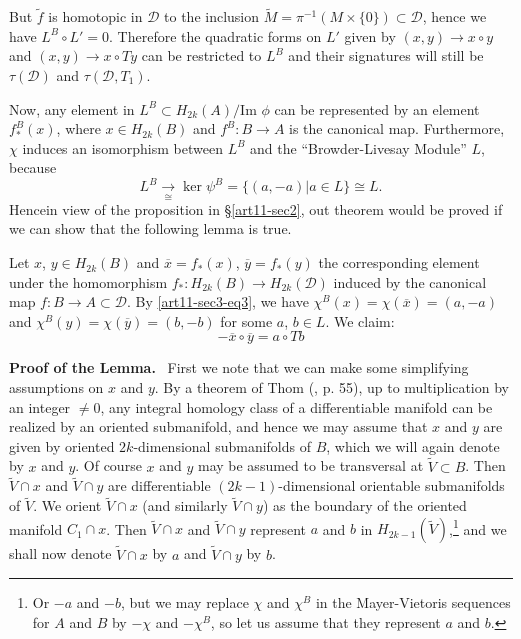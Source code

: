 \smallskip

But $\widetilde{f}$ is homotopic in $\mathscr{D}$ to the inclusion $\widetilde{M}=\pi^{-1}(M\times \{0\})\subset \mathscr{D}$, hence we have $L^{B}\circ L'=0$. Therefore the quadratic forms on $L'$ given by $(x,y)\to x\circ y$ and $(x,y)\to x\circ Ty$ can be restricted to $L^{B}$ and their signatures will still be $\tau(\mathscr{D})$ and $\tau(\mathscr{D},T_{1})$.

\smallskip

Now, any element in $L^{B}\subset H_{2k}(A)/\text{Im~}\phi$ can be represented by an element $f^{B}_{*}(x)$, where $x\in H_{2k}(B)$ and $f^{B}:B\to A$ is the canonical map. Furthermore, $\chi$ induces an isomorphism between $L^{B}$ and the ``Browder-Livesay Module'' $L$, because
$$
L^{B}\xrightarrow[\cong]{} \ker \psi^{B}=\{(a,-a) | a\in L\}\cong L.
$$
Hence\pageoriginale in view of the proposition in \S\ref{art11-sec2}, out theorem would be proved if we can show that the following lemma is true.

\begin{lemma*}
Let $x$, $y\in H_{2k}(B)$ and $\overline{x}=f_{*}(x)$, $\overline{y}=f_{*}(y)$ the corresponding element under the homomorphism $f_{*}:H_{2k}(B)\to H_{2k}(\mathscr{D})$ induced by the canonical map $f:B\to A\subset \mathscr{D}$. By \eqref{art11-sec3-eq3}, we have $\chi^{B}(x)=\chi(\overline{x})=(a,-a)$ and $\chi^{B}(y)=\chi(\overline{y})=(b,-b)$ for some $a$, $b\in L$. We claim:
\begin{equation*}
-\overline{x}\circ \overline{y}=a\circ Tb\tag{4}\label{art11-sec3-eq4}
\end{equation*}
\end{lemma*}

\noindent
{\bf Proof of the Lemma.}~ First we note that we can make some simplifying assumptions on $x$ and $y$. By a theorem of Thom (\cite{art11-key9}, p. 55), up to multiplication by an integer $\neq 0$, any integral homology class of a differentiable manifold can be realized by an oriented submanifold, and hence we may assume that $x$ and $y$ are given by oriented $2k$-dimensional submanifolds of $B$, which we will again denote by $x$ and $y$. Of course $x$ and $y$ may be assumed to be transversal at $\widetilde{V}\subset B$. Then $\widetilde{V}\cap x$ and $\widetilde{V}\cap y$ are differentiable $(2k-1)$-dimensional orientable submanifolds of $\widetilde{V}$. We orient $\widetilde{V}\cap x$ (and similarly $\widetilde{V}\cap y$) as the boundary of the oriented manifold $C_{1}\cap x$. Then $\widetilde{V}\cap x$ and $\widetilde{V}\cap y$ represent $a$ and $b$ in $H_{2k-1}(\widetilde{V})$,\footnote{Or $-a$ and $-b$, but we may replace $\chi$ and $\chi^{B}$ in the Mayer-Vietoris sequences for $A$ and $B$ by $-\chi$ and $-\chi^{B}$, so let us assume that they represent $a$ and $b$.} and we shall now denote $\widetilde{V}\cap x$ by $a$ and $\widetilde{V}\cap y$ by $b$.

